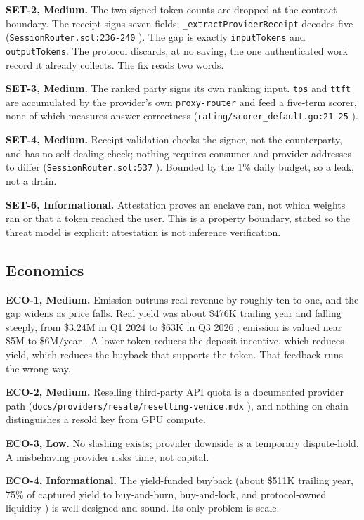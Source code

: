 \documentclass[11pt,a4paper]{article}
\newcommand{\code}[1]{\texttt{\small #1}}
\newcommand{\prov}[1]{{\color{muted}\footnotesize\sffamily[#1]}}
\begin{document}
\textbf{SET-2, Medium.} The two signed token counts are dropped at the contract boundary. The
receipt signs seven fields; \code{\_extractProviderReceipt} decodes five
(\code{SessionRouter.sol:236-240} \prov{verified}). The gap is exactly \code{inputTokens} and
\code{outputTokens}. The protocol discards, at no saving, the one authenticated work record it
already collects. The fix reads two words.

\textbf{SET-3, Medium.} The ranked party signs its own ranking input. \code{tps} and
\code{ttft} are accumulated by the provider's own \code{proxy-router} and feed a five-term
scorer, none of which measures answer correctness (\code{rating/scorer\_default.go:21-25}
\prov{verified}).

\textbf{SET-4, Medium.} Receipt validation checks the signer, not the counterparty, and has no
self-dealing check; nothing requires consumer and provider addresses to differ
(\code{SessionRouter.sol:537} \prov{verified}). Bounded by the 1\% daily budget, so a leak, not
a drain.

\textbf{SET-6, Informational.} Attestation proves an enclave ran, not which weights ran or that
a token reached the user. This is a property boundary, stated so the threat model is explicit:
attestation is not inference verification.

\subsection{Economics}

\textbf{ECO-1, Medium.} Emission outruns real revenue by roughly ten to one, and the gap widens
as price falls. Real yield was about \$476K trailing year and falling steeply, from \$3.24M in
Q1 2024 to \$63K in Q3 2026 \prov{verified}; emission is valued near \$5M to \$6M/year
\prov{verified}. A lower token reduces the deposit incentive, which reduces yield, which reduces
the buyback that supports the token. That feedback runs the wrong way.

\textbf{ECO-2, Medium.} Reselling third-party API quota is a documented provider path
(\code{docs/providers/resale/reselling-venice.mdx} \prov{verified}), and nothing on chain
distinguishes a resold key from GPU compute.

\textbf{ECO-3, Low.} No slashing exists; provider downside is a temporary dispute-hold. A
misbehaving provider risks time, not capital.

\textbf{ECO-4, Informational.} The yield-funded buyback (about \$511K trailing year, 75\% of
captured yield to buy-and-burn, buy-and-lock, and protocol-owned liquidity \prov{verified}) is
well designed and sound. Its only problem is scale.
\end{document}
